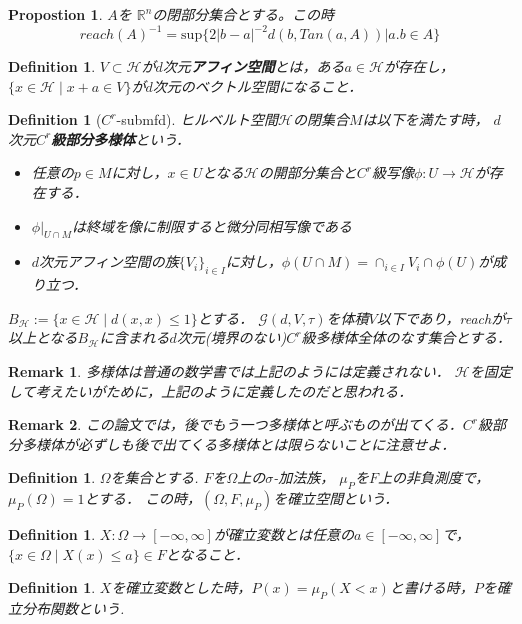 \documentclass{ujarticle}
\newtheorem{dfn}[thm]{Definition}
\newtheorem{prop}[thm]{Propostion}
\newtheorem*{rem}{Remark}
\newcommand{\gdvt}{\mathcal{G}(d,V,\tau)}
\begin{document}
\begin{prop} $A$を $\mathbb{R}^n$の閉部分集合とする。この時
  \begin{equation*}
   reach(A)^{-1}=\mathrm{sup}\{2|b-a|^{-2}d(b,Tan(a,A)) | a.b \in A\}
  \end{equation*}
\end{prop}
\begin{dfn}
 $V \subset \mathcal{H}$が$d$次元\textbf{アフィン空間}とは，ある$a \in \mathcal{H}$が存在し，$\{ x \in \mathcal{H} \mid x + a \in V \}$が$d$次元のベクトル空間になること．
\end{dfn}
\begin{dfn}[$C^r$-submfd]
ヒルベルト空間$\mathcal{H}$の閉集合$M$は以下を満たす時，
$d$次元$C^r$\textbf{級部分多様体}という．
\begin{itemize}
  \item 任意の$p \in M$に対し，$x \in U$となる$\mathcal{H}$の開部分集合と$C^r$級写像$\phi:U \to \mathcal{H}$が存在する．
  \item $\phi|_{U \cap M}$は終域を像に制限すると微分同相写像である
  \item $d$次元アフィン空間の族$\{ V_i \}_{i \in I}$に対し，$\phi(U \cap M)=\cap_{i \in I} V_i \cap \phi(U)$が成り立つ．
\end{itemize}
  $B_{\mathcal{H}}:= \{ x \in \mathcal{H} \mid d(x,x) \le 1 \}$とする．
$\gdvt$を体積$V$以下であり，reachが$\tau$以上となる$B_{\mathcal{H}}$に含まれる$d$次元(境界のない)$C^r$級多様体全体のなす集合とする．

\end{dfn}
\begin{rem}
 多様体は普通の数学書では上記のようには定義されない．
 $\mathcal{H}$を固定して考えたいがために，上記のように定義したのだと思われる．
\end{rem}
\begin{rem}
 この論文では，後でもう一つ多様体と呼ぶものが出てくる．$C^r$級部分多様体が必ずしも後で出てくる多様体とは限らないことに注意せよ．
\end{rem}

\begin{dfn}
 $\Omega$を集合とする.
 $F$を$\Omega$上の$\sigma$-加法族，
 $\mu_P$を$F$上の非負測度で，$\mu_P(\Omega)=1$とする．
 この時，$(\Omega,F,\mu_P)$を確立空間という．
\end{dfn}
\begin{dfn}
 $X:\Omega \to [-\infty,\infty]$が確立変数とは任意の$a \in [-\infty,\infty]$で，$\{x \in \Omega \mid X(x) \le a \} \in F$となること．
\end{dfn}
\begin{dfn}
 $X$を確立変数とした時，$P(x) = \mu_P(X <x)$と書ける時，$P$を確立分布関数という.
\end{dfn}
\end{document}
